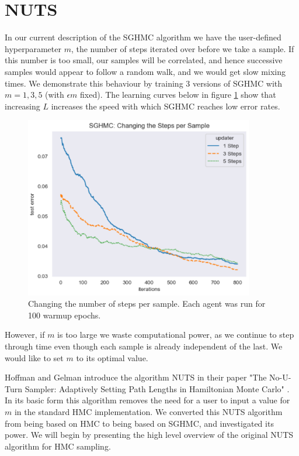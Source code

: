 \section{NUTS}

In our current description of the SGHMC algorithm we have the user-defined hyperparameter $m$, the number of steps iterated over before we take a sample. If this number is too small, our samples will be correlated, and hence successive samples would appear to follow a random walk, and we would get slow mixing times. We demonstrate this behaviour by training 3 versions of SGHMC with $m=1,3,5$ (with $\epsilon m$ fixed). The learning curves below in figure \ref{num_steps} show that increasing $L$ increases the speed with which SGHMC reaches low error rates.

\begin{figure}[h!]
\centering
\includegraphics[width=100mm]{parts/Images/changing_num_steps.png}
\caption{Changing the number of steps per sample. Each agent was run for 100 warmup epochs.}
\label{num_steps}
\end{figure}

However, if $m$ is too large we waste computational power, as we continue to step through time even though each sample is already independent of the last. We would like to set $m$ to its optimal value.

Hoffman and Gelman introduce the algorithm NUTS in their paper "The No-U-Turn Sampler: Adaptively Setting Path Lengths in Hamiltonian Monte Carlo" \cite{nuts}. In its basic form this algorithm removes the need for a user to input a value for $m$ in the standard HMC implementation. We converted this NUTS algorithm from being based on HMC to being based on SGHMC, and investigated its power. We will begin by presenting the high level overview of the original NUTS algorithm for HMC sampling.

